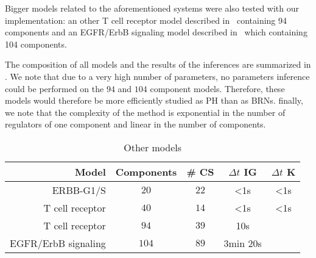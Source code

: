 Bigger models related to the aforementioned systems were also tested with our implementation:
an other T cell receptor model described in~\cite{SaezRodriguez2007} containing 94 components
and an EGFR/ErbB signaling model described in~\cite{Samaga2009} which containing 104 components.

The composition of all models and the results of the inferences are summarized in .
We note that due to a very high number of parameters, no parameters inference could be performed on the $94$ and $104$ component models.
Therefore, these models would therefore be more efficiently studied as PH than as BRNs.
finally, we note that the complexity of the method is exponential in the number of regulators of one
component and linear in the number of components.

\begin{table}
\begin{center}
  \begin{tabular}{r|c|c|c|c}
    \textbf{Model} & \textbf{Components} & \textbf{\# CS} & \textbf{$\Delta t$ IG} & \textbf{$\Delta t$ K}
\\\hline\hline
    ERBB-G1/S & $20$ & $22$ & <1s & <1s
\\\hline
    T cell receptor & $40$ & $14$ & <1s & <1s
\\\hline
    T cell receptor & $94$ & $39$ & 10s & 
\\\hline
    EGFR/ErbB signaling & $104$ & $89$ & 3min 20s & 
  \end{tabular}
\end{center}
  \caption{Other models }
  \label{tb:computation}
\end{table}



